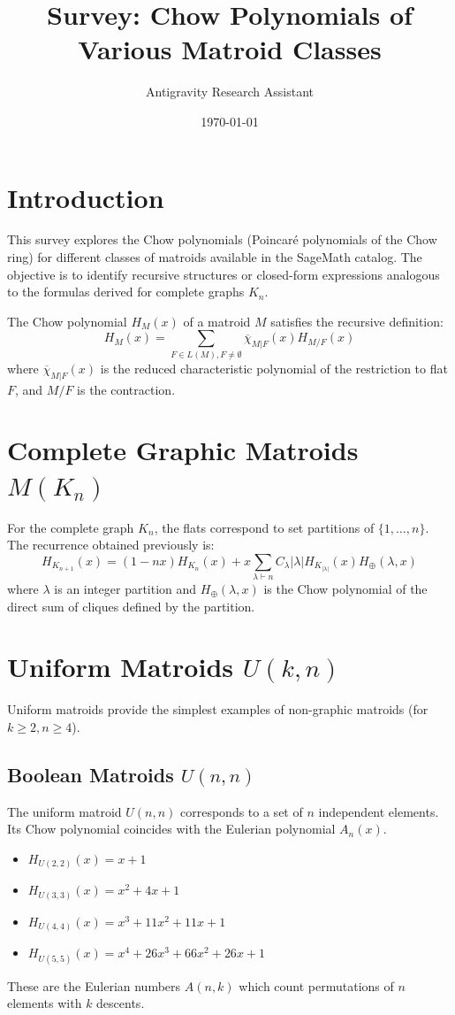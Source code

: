 \documentclass{article}
\title{Survey: Chow Polynomials of Various Matroid Classes}
\author{Antigravity Research Assistant}
\date{\today}
\begin{document}
\maketitle

\section{Introduction}
This survey explores the Chow polynomials (Poincaré polynomials of the Chow ring) for different classes of matroids available in the SageMath catalog. The objective is to identify recursive structures or closed-form expressions analogous to the formulas derived for complete graphs $K_n$.

The Chow polynomial $H_M(x)$ of a matroid $M$ satisfies the recursive definition:
\begin{equation}
    H_M(x) = \sum_{F \in L(M), F \neq \emptyset} \overline{\chi}_{M|F}(x) H_{M/F}(x)
\end{equation}
where $\overline{\chi}_{M|F}(x)$ is the reduced characteristic polynomial of the restriction to flat $F$, and $M/F$ is the contraction.

\section{Complete Graphic Matroids $M(K_n)$}
For the complete graph $K_n$, the flats correspond to set partitions of $\{1, \dots, n\}$. The recurrence obtained previously is:
\begin{equation}
    H_{K_{n+1}}(x) = (1 - nx) H_{K_n}(x) + x \sum_{\lambda \vdash n} C_\lambda |\lambda| H_{K_{|\lambda|}}(x) H_{\oplus}(\lambda, x)
\end{equation}
where $\lambda$ is an integer partition and $H_{\oplus}(\lambda, x)$ is the Chow polynomial of the direct sum of cliques defined by the partition.

\section{Uniform Matroids $U(k, n)$}
Uniform matroids provide the simplest examples of non-graphic matroids (for $k \geq 2, n \geq 4$).

\subsection{Boolean Matroids $U(n, n)$}
The uniform matroid $U(n, n)$ corresponds to a set of $n$ independent elements. Its Chow polynomial coincides with the Eulerian polynomial $A_n(x)$.
\begin{itemize}
    \item $H_{U(2,2)}(x) = x + 1$
    \item $H_{U(3,3)}(x) = x^2 + 4x + 1$
    \item $H_{U(4,4)}(x) = x^3 + 11x^2 + 11x + 1$
    \item $H_{U(5,5)}(x) = x^4 + 26x^3 + 66x^2 + 26x + 1$
\end{itemize}
These are the Eulerian numbers $A(n, k)$ which count permutations of $n$ elements with $k$ descents.
\end{document}
